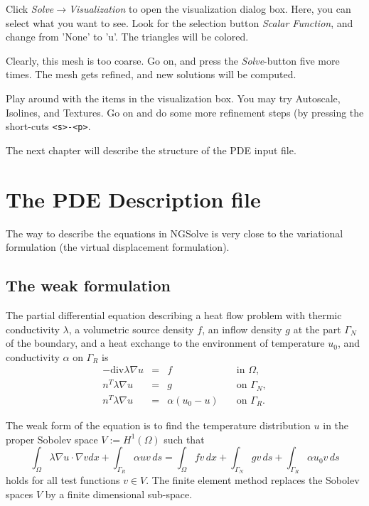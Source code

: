 \documentclass[12pt]{book}
\begin{document}
Click {\em Solve$\rightarrow$Visualization} to open the visualization dialog box. Here,
you can select what you want to see. Look for the selection button {\em Scalar Function}, and change from 'None' to 'u'. The triangles will be colored.


Clearly, this mesh is too coarse. Go on, and press the {\em Solve}-button five more times. The mesh gets refined, and new solutions will be 
computed. 


Play around with the items in the visualization box. You may try Autoscale, Isolines, and Textures. Go on and do some more refinement steps (by pressing the short-cuts {\tt <s>-<p>}.


The next chapter will describe the structure of the PDE input file.


\chapter{The PDE Description file}

The way to describe the equations in NGSolve is very close to
the variational formulation (the virtual displacement formulation).

\section{The weak formulation}

The partial differential equation describing a heat flow problem
with thermic conductivity $\lambda$, a volumetric source density $f$, 
an inflow density $g$ at the part $\Gamma_N$ of the boundary, 
and a heat exchange to the environment of temperature $u_0$, and 
conductivity $\alpha$ on $\Gamma_R$ is
\begin{displaymath}
\begin{array}{rcll}
-\mbox {div} \lambda \nabla u & = & f \quad & \mbox{in } \Omega, \\
n^T \lambda \nabla u & = & g  \quad & \mbox{on } \Gamma_N, \\
n^T \lambda \nabla u & = & \alpha (u_0 - u)  \quad & \mbox{on } \Gamma_R.
\end{array}
\end{displaymath}

 
The weak form of the equation is to find the temperature distribution $u$
in the proper Sobolev space $V := H^1(\Omega)$ such that
$$
\int_\Omega \lambda \nabla u \cdot \nabla v dx + \int_{\Gamma_R} \alpha u v \, ds =
\int_\Omega f v \, dx + \int_{\Gamma_N} g v \, ds + \int_{\Gamma_R} \alpha u_0 v \, ds
$$
holds for all test functions $v \in V$. The finite element method replaces the
Sobolev spaces $V$ by a finite dimensional sub-space.
\end{document}
